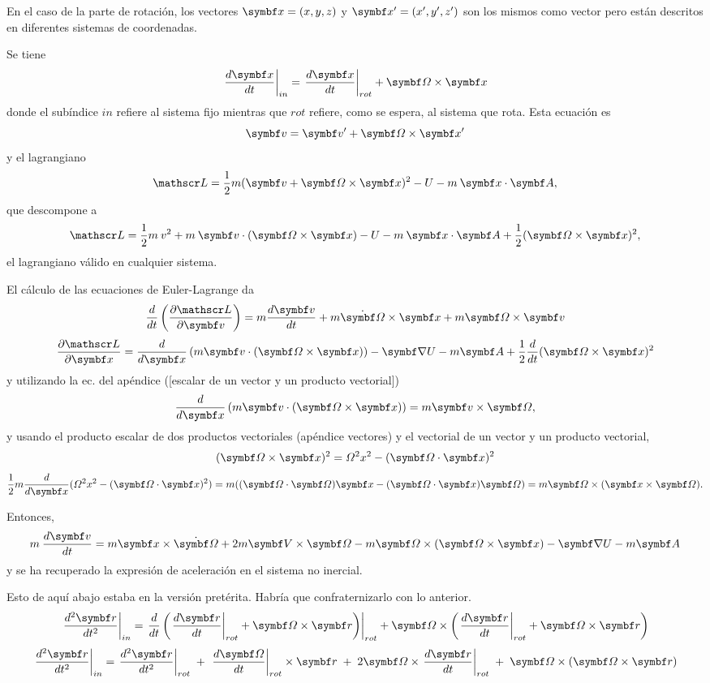 \documentclass[10pt,oneside]{CBFT_book}
\begin{document}
En el caso de la parte de rotación, los vectores $\vb{x}=(x,y,z)$ y $\vb{x}'=(x',y',z')$ son los mismos como vector pero
están descritos en diferentes sistemas de coordenadas.

Se tiene 
\[
	\left. \dtot{\vb{x}}{t} \right|_{in} = \left. \dtot{\vb{x}}{t} \right|_{rot} + \vb{\Omega} \times \vb{x}
\]
donde el subíndice $in$ refiere al sistema fijo mientras que $rot$ refiere, como se espera, al sistema que rota.
Esta ecuación es
\[
	\vb{v} = \vb{v}' + \vb{\Omega} \times \vb{x}'
\]
y el lagrangiano 
\[
	\Lag = \frac 1 2 m ( \vb{v} + \vb{\Omega} \times \vb{x} )^2 - U - m \: \vb{x} \cdot \vb{A},
\]
que descompone a 
\[
	\Lag = \frac 1 2 m \: v^2 + m \: \vb{v} \cdot ( \vb{\Omega} \times \vb{x} ) - U 
	- m \: \vb{x} \cdot \vb{A} + \frac 1 2 (\vb{\Omega} \times \vb{x} )^2,
\]
el lagrangiano válido en cualquier sistema.

El cálculo de las ecuaciones de Euler-Lagrange da 
\[
	\dtot{}{t}\left( \dpar{\Lag}{\vb{v}} \right) = m \dtot{\vb{v}}{t} + m \dot{\vb{\Omega}} \times \vb{x} + m \vb{\Omega} \times \vb{v}
\]
\[
	\dpar{\Lag}{\vb{x}} = \dtot{}{\vb{x}} \left( m \vb{v} \cdot ( \vb{\Omega} \times \vb{x} ) \right) - 
	\Nabla U - m \vb{A} + \frac 1 2 \dtot{}{t} ( \vb{\Omega} \times \vb{x} )^2
\]
y utilizando la ec. del apéndice ([escalar de un vector y un producto vectorial])
\[
	\dtot{}{\vb{x}} \left( m \vb{v} \cdot ( \vb{\Omega} \times \vb{x} ) \right) = m \vb{v} \times \vb{\Omega},
\]
y usando el producto escalar de dos productos vectoriales (apéndice vectores) y el vectorial de un vector y un producto vectorial,
\[
	( \vb{\Omega} \times \vb{x} )^2 = \Omega^2 x^2 - ( \vb{\Omega} \cdot \vb{x} )^2
\]
\[
	\frac 1  2 m \dtot{}{\vb{x}}( \Omega^2 x^2 - ( \vb{\Omega} \cdot \vb{x} )^2 ) = 
	m ( (\vb{\Omega} \cdot \vb{\Omega} ) \vb{x} - ( \vb{\Omega} \cdot \vb{x} ) \vb{\Omega} ) =
	m \vb{\Omega} \times ( \vb{x} \times \vb{\Omega} ).
\]

Entonces,
\[
	m \: \dtot{\vb{v}}{t} = m \vb{x} \times \dot{\vb{\Omega}} + 2 m \vb{V} \times \vb{\Omega} - m \vb{\Omega} \times ( \vb{\Omega} \times \vb{x} )
	- \Nabla U - m \vb{A}
\]
y se ha recuperado la expresión de aceleración en el sistema no inercial.

Esto de aquí abajo estaba en la versión pretérita. Habría que confraternizarlo con lo anterior.
\[
	\left. \dtot[2]{\vb{r}}{t} \right|_{in} = 
	\left. \frac{d}{dt}\left( \left. \dtot{\vb{r}}{t} \right|_{rot} + \vb{\Omega} \times \vb{r} \right) \right|_{rot}
	+ \vb{\Omega} \times \left( \left. \dtot{\vb{r}}{t} \right|_{rot} + \vb{\Omega} \times \vb{r} \right)
\]
\[
	\left. \dtot[2]{\vb{r}}{t} \right|_{in} = 
	\left. \dtot[2]{\vb{r}}{t} \right|_{rot}  \; +  \; \left.\dtot{\vb{\Omega}}{t}\right|_{rot} \times \vb{r}
	 \;  + \; 2 \vb{\Omega} \times \left. \dtot{\vb{r}}{t} \right|_{rot} 
	 \;  + \;  \vb{\Omega} \times \left( \vb{\Omega} \times \vb{r} \right)
\]
\end{document}
